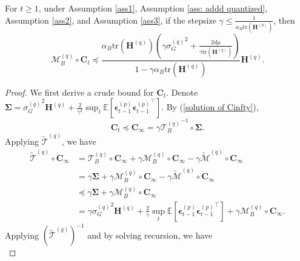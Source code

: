 \documentclass[11pt, letterpaper]{article}
\begin{document}
\begin{lemma}
    \label{A bound for M_B^{(q)} C_t, master}
    For $t \geq 1$, under Assumption \ref{ass1}, Assumption \ref{ass: addd quantized}, Assumption \ref{ass2}, and Assumption \ref{ass3}, if the stepsize $\gamma \leq \frac{1}{\alpha_B\mathrm{tr}(\mathbf{H}^{(q)})}$, then
    \begin{equation*}
        \mathcal{M}_B^{(q)} \circ \mathbf{C}_t \preceq \frac{\alpha_B\mathrm{tr}(\mathbf{H}^{(q)})\left(\gamma{\sigma_G^{(q)}}^2+\frac{2d\mu}{\gamma\mathrm{tr}(\mathbf{H}^{(q)})}\right)}{1-\gamma\alpha_B\mathrm{tr}(\mathbf{H}^{(q)})} \mathbf{H}^{(q)}.
    \end{equation*}
\end{lemma}
\begin{proof}
We first derive a crude bound for $\mathbf{C}_t$. Denote $\boldsymbol{\Sigma}={\sigma_G^{(q)}}^2\mathbf{H}^{(q)}+\frac{2}{\gamma^2}\sup_t\mathbb{E}\left[\boldsymbol{\epsilon}_{t-1}^{(p)}{\boldsymbol{\epsilon}_{t-1}^{(p)}}^\top\right]$. By (\ref{solution of Cinfty}),
\begin{equation*}
    \mathbf{C}_t \preceq \mathbf{C}_\infty=\gamma{\mathcal{T}_B^{(q)}}^{-1}\circ\mathbf{\Sigma}.
\end{equation*}
Applying $\widetilde{\mathcal{T}}^{(q)}$, we have
\begin{equation*}
        \begin{aligned}
            \widetilde{\mathcal{T}}^{(q)}\circ\mathbf{C}_{\infty} & =\mathcal{T}_B^{(q)}\circ\mathbf{C}_{\infty}+\gamma\mathcal{M}_B^{(q)}\circ\mathbf{C}_{\infty}-\gamma\widetilde{\mathcal{M}}^{(q)}\circ\mathbf{C}_{\infty} \\
            & =\gamma\boldsymbol{\Sigma}+\gamma\mathcal{M}_B^{(q)}\circ\mathbf{C}_\infty-\gamma\widetilde{\mathcal{M}}^{(q)}\circ\mathbf{C}_\infty\\
            & \preceq\gamma\boldsymbol{\Sigma}+\gamma\mathcal{M}_B^{(q)}\circ\mathbf{C}_\infty\\
            &=\gamma{\sigma_G^{(q)}}^2\mathbf{H}^{(q)}+\frac{2}{\gamma}\sup_t\mathbb{E}\left[\boldsymbol{\epsilon}_{t-1}^{(p)}{\boldsymbol{\epsilon}_{t-1}^{(p)}}^\top\right]+\gamma\mathcal{M}_B^{(q)}\circ\mathbf{C}_\infty.
        \end{aligned}
\end{equation*}
Applying $(\widetilde{\mathcal{T}}^{(q)})^{-1}$ and by solving recursion, we have
\begin{equation}

\end{equation}
\end{proof}
\end{document}
